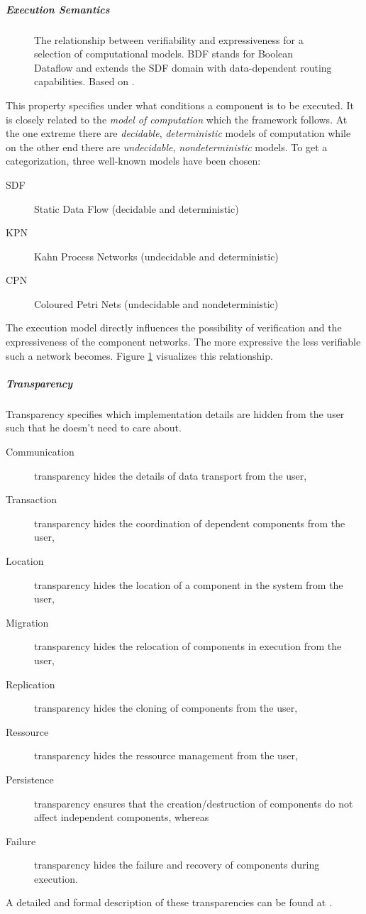 \documentclass[a4paper,twocolumn]{esapub2005} %
\begin{document}
\subparagraph{Execution Semantics}
\begin{figure}
    \centering
    \caption{
        The relationship between verifiability and expressiveness for a selection of computational models.
        BDF stands for Boolean Dataflow and extends the SDF domain with data-dependent routing capabilities.
        Based on \cite{Basten}.
    }
    \label{fig:verifiability}
\end{figure}
This property specifies under what conditions a component is to be executed.
It is closely related to the \emph{model of computation} which the framework follows.
At the one extreme there are \emph{decidable}, \emph{deterministic} models of computation
while on the other end there are \emph{undecidable}, \emph{nondeterministic} models.
To get a categorization, three well-known models have been chosen:
\begin{description}
    \item[SDF] Static Data Flow (decidable and deterministic)
    \item[KPN] Kahn Process Networks (undecidable and deterministic)
    \item[CPN] Coloured Petri Nets (undecidable and nondeterministic)
\end{description}
The execution model directly influences the possibility of verification and the expressiveness of the component networks.
The more expressive the less verifiable such a network becomes.
Figure \ref{fig:verifiability} visualizes this relationship.

\subparagraph{Transparency}
Transparency specifies which implementation details are hidden from the user such that he doesn't need to care about.
\begin{description}
\item[Communication] transparency hides the details of data transport from the user,
\item[Transaction] transparency hides the coordination of dependent components from the user,
\item[Location] transparency hides the location of a component in the system from the user,
\item[Migration] transparency hides the relocation of components in execution from the user,
\item[Replication] transparency hides the cloning of components from the user,
\item[Ressource] transparency hides the ressource management from the user,
\item[Persistence] transparency ensures that the creation/destruction of components do not affect independent components,
whereas \item[Failure] transparency hides the failure and recovery of components during execution.
\end{description}
A detailed and formal description of these transparencies can be found at \cite{RM-ODP}.
\end{document}
